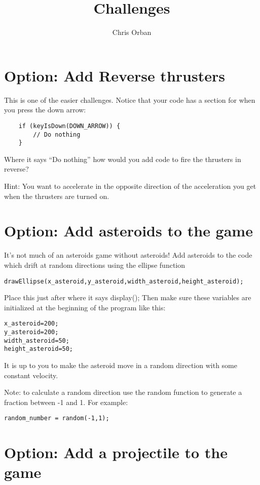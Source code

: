 \documentclass{ximera}
\author{Chris Orban}
\title{Challenges}
\begin{document}
\begin{abstract}
\end{abstract}
\maketitle

\section{Option: Add Reverse thrusters}

This is one of the easier challenges. Notice that your code has a section for when you press the down arrow:
\begin{verbatim}
    if (keyIsDown(DOWN_ARROW)) {
        // Do nothing                                                           
    }
\end{verbatim}
Where it says ``Do nothing'' how would you add code to fire the thrusters in reverse?

Hint: You want to accelerate in the opposite direction of the acceleration you get when the thrusters are turned on.

\section{Option: Add asteroids to the game}

It's not much of an asteroids game without asteroids! Add asteroids to the code which drift at random directions using the ellipse function
\begin{verbatim}
drawEllipse(x_asteroid,y_asteroid,width_asteroid,height_asteroid);
\end{verbatim}
Place this just after where it says display(); Then make sure these variables are initialized at the beginning of the program like this:
\begin{verbatim}
x_asteroid=200;
y_asteroid=200;
width_asteroid=50;
height_asteroid=50;
\end{verbatim}
It is up to you to make the asteroid move in a random direction with some constant velocity.

Note: to calculate a random direction use the random function to generate a fraction between -1 and 1. For example:
\begin{verbatim}
random_number = random(-1,1);
\end{verbatim}

\section{Option: Add a projectile to the game}
\end{document}
